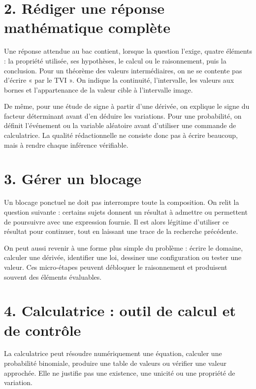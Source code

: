 
\section{2. Rédiger une réponse mathématique complète}
Une réponse attendue au bac contient, lorsque la question l’exige, quatre éléments : la propriété utilisée, ses hypothèses, le calcul ou le raisonnement, puis la conclusion. Pour un théorème des valeurs intermédiaires, on ne se contente pas d’écrire « par le TVI ». On indique la continuité, l’intervalle, les valeurs aux bornes et l’appartenance de la valeur cible à l’intervalle image.

De même, pour une étude de signe à partir d’une dérivée, on explique le signe du facteur déterminant avant d’en déduire les variations. Pour une probabilité, on définit l’événement ou la variable aléatoire avant d’utiliser une commande de calculatrice. La qualité rédactionnelle ne consiste donc pas à écrire beaucoup, mais à rendre chaque inférence vérifiable.

\section{3. Gérer un blocage}
Un blocage ponctuel ne doit pas interrompre toute la composition. On relit la question suivante : certains sujets donnent un résultat à admettre ou permettent de poursuivre avec une expression fournie. Il est alors légitime d’utiliser ce résultat pour continuer, tout en laissant une trace de la recherche précédente.

On peut aussi revenir à une forme plus simple du problème : écrire le domaine, calculer une dérivée, identifier une loi, dessiner une configuration ou tester une valeur. Ces micro-étapes peuvent débloquer le raisonnement et produisent souvent des éléments évaluables.

\section{4. Calculatrice : outil de calcul et de contrôle}
La calculatrice peut résoudre numériquement une équation, calculer une probabilité binomiale, produire une table de valeurs ou vérifier une valeur approchée. Elle ne justifie pas une existence, une unicité ou une propriété de variation.

